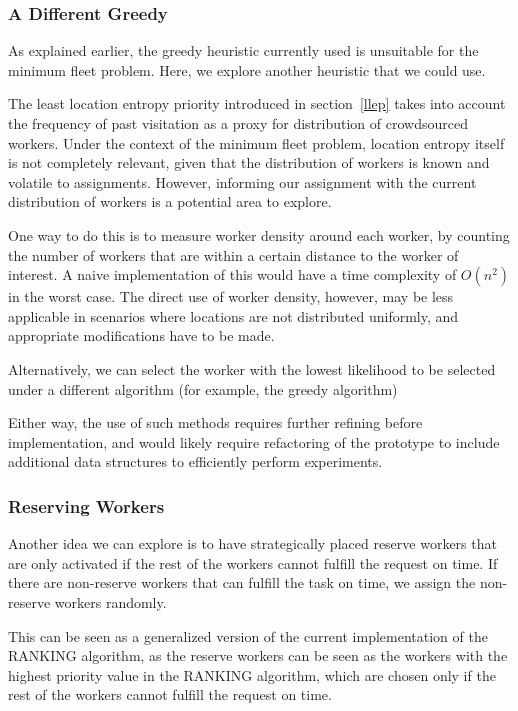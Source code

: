 \documentclass[urop]{nurop}
\begin{document}
\subsubsection{A Different Greedy}
\label{heuristics}
As explained earlier, the greedy heuristic currently used is unsuitable for the minimum fleet problem. Here, we explore another heuristic that we could use.

The least location entropy priority introduced in section~\ref{llep} takes into account the frequency of past visitation as a proxy for distribution of crowdsourced workers. Under the context of the minimum fleet problem, location entropy itself is not completely relevant, given that the distribution of workers is known and volatile to assignments. However, informing our assignment with the current distribution of workers is a potential area to explore.

One way to do this is to measure worker density around each worker, by counting the number of workers that are within a certain distance to the worker of interest. A naive implementation of this would have a time complexity of $O(n^2)$ in the worst case. The direct use of worker density, however, may be less applicable in scenarios where locations are not distributed uniformly, and appropriate modifications have to be made.

Alternatively, we can select the worker with the lowest likelihood to be selected under a different algorithm (for example, the greedy algorithm)

Either way, the use of such methods requires further refining before implementation, and would likely require refactoring of the prototype to include additional data structures to efficiently perform experiments.

\subsubsection{Reserving Workers}
Another idea we can explore is to have strategically placed reserve workers that are only activated if the rest of the workers cannot fulfill the request on time. If there are non-reserve workers that can fulfill the task on time, we assign the non-reserve workers randomly.

This can be seen as a generalized version of the current implementation of the RANKING algorithm, as the reserve workers can be seen as the workers with the highest priority value in the RANKING algorithm, which are chosen only if the rest of the workers cannot fulfill the request on time.
\end{document}
